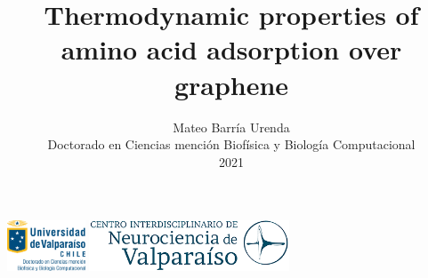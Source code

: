 \documentclass[aspectratio=169, compress]{beamer}
\title{Thermodynamic properties of amino acid adsorption over graphene}
\author{Mateo Barría Urenda \\ \vspace{0.1cm} Doctorado en Ciencias
  mención Biofísica y Biología Computacional \\ \vfill 2021}
\date{}
\subtitle{}
\begin{document}
\begin{frame}[plain]
  \vspace{0.3cm}
  \includegraphics[height = 1.5cm]{logos/logoDBBC-transp.png}
  \hfill
  \includegraphics[height = 1.5cm]{logos/Logo-CINV.png}
  \vspace{0.3cm}
  \maketitle
\end{frame}
\end{document}
